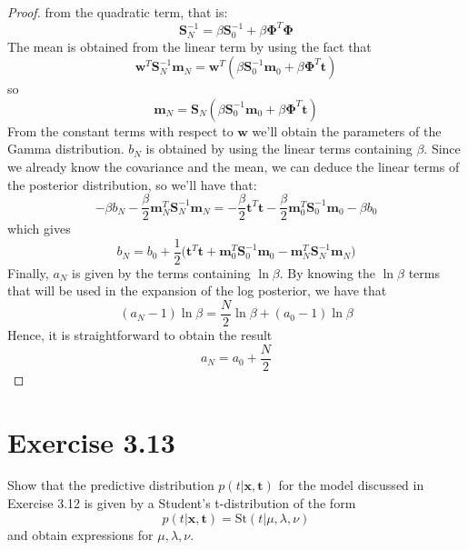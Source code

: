 \begin{proof}
    from the quadratic term, that is:
     \[
         \mathbf{S}_N^{-1} = \beta \mathbf{S}_0^{-1} + \beta \mathbf{\Phi}^T\mathbf{\Phi}
    \] 
    The mean is obtained from the linear term by using the fact that
    \[
        \mathbf{w}^T \mathbf{S}_N^{-1} \mathbf{m}_N
        = \mathbf{w}^T(\beta \mathbf{S}_0^{-1} \mathbf{m}_0 + \beta \mathbf{\Phi}^T \mathbf{t})
    \] 
    so 
    \[
        \mathbf{m}_N = \mathbf{S}_N 
            (\beta \mathbf{S}_0^{-1} \mathbf{m}_0 + \beta \mathbf{\Phi}^T \mathbf{t})
    \] 
    From the constant terms with respect to $\mathbf{w}$ we'll obtain the
    parameters of the Gamma distribution. $b_N$ is obtained by using the 
    linear terms containing  $\beta$. Since we already know the covariance and the 
    mean, we can deduce the linear terms of the posterior distribution, so we'll have
    that:
    \[
        - \beta b_N
        -\frac{\beta}{2} \mathbf{m}_N^T \mathbf{S}_N^{-1} \mathbf{m}_N
        = -\frac{\beta}{2} \mathbf{t}^T\mathbf{t} 
        -\frac{\beta}{2} \mathbf{m}_0^T \mathbf{S}_0^{-1} \mathbf{m}_0
        -\beta b_0
    \]
    which gives
    \[
        b_N 
        = b_0 + \frac{1}{2} \big(
            \mathbf{t}^T\mathbf{t} + \mathbf{m}_0^T\mathbf{S}_0^{-1}\mathbf{m}_0
            - \mathbf{m}_N^T\mathbf{S}_N^{-1}\mathbf{m}_N\big)
    \] 
    Finally, $a_N$ is given by the terms containing $\ln \beta$. 
    By knowing the $\ln \beta$ terms that will be used in the expansion of the 
    log posterior, we have that
    \[
        (a_N - 1) \ln \beta = \frac{N}{2} \ln \beta + (a_0 - 1) \ln \beta
    \] 
    Hence, it is straightforward to obtain the result
    \[
        a_N = a_0 + \frac{N}{2}
    \] 
\end{proof}

\section*{Exercise 3.13}
Show that the predictive distribution $p(t | \mathbf{x}, \mathbf{t})$ for the 
model discussed in Exercise 3.12 is given by a Student's t-distribution of
the form
\begin{equation}\label{eq:3.114}\tag{3.114}
    p(t | \mathbf{x}, \mathbf{t}) = \text{St}(t | \mu, \lambda, \nu)
\end{equation}
and obtain expressions for $\mu, \lambda, \nu$.

\vspace{1em}

